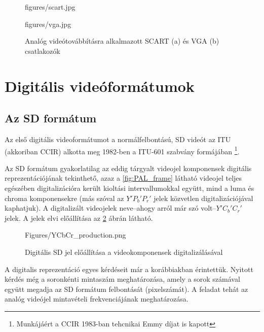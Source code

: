 \begin{figure}[]
	\centering
	\begin{minipage}[c]{0.63\textwidth}
	\begin{overpic}[width = 0.47\columnwidth ]{figures/scart.jpg}
	\end{overpic} \hfill
		\begin{overpic}[width = 0.4\columnwidth ]{figures/vga.jpg}
	\end{overpic} \end{minipage}\hfill
	\begin{minipage}[c]{0.35\textwidth}
	\caption{Analóg videótovábbításra alkalmazott SCART (a) és VGA (b) csatlakozók}
	\label{Fig:scart_vga}  \end{minipage}
\end{figure}

\section{Digitális videóformátumok}
	
\subsection{Az SD formátum}

Az első digitális videoformátumot a normálfelbontású, SD videót az ITU (akkoriban CCIR) alkotta meg 1982-ben a ITU-601 szabvány formájában \footnote{Munkájáért a CCIR 1983-ban tehcnikai Emmy díjat is kapott}.

Az SD formátum gyakorlatilag az eddig tárgyalt videojel komponensek digitális reprezentációjának tekinthető, azaz a \ref{fig:PAL_frame} látható videojel teljes egészében digitalizációra került kioltási intervallumokkal együtt, mind a luma és chroma komponensekre (más szóval az $Y'P_b'P_r'$ jelek közvetlen digitalizációjával kaphatjuk).
A digitalizált videojelek neve--ahogy arról már szó volt--$Y'C_b'C_r'$ jelek.
A jelek elvi előállítása az \ref{Fig:SD_production} ábrán látható.
\begin{figure}[]
	\centering
	\begin{overpic}[width = 0.8 \columnwidth ]{Figures/YCbCr_production.png}
	\end{overpic}
	\caption{Digitális SD jel előállítása a videokomponensek digitalizálásával}
	\label{Fig:SD_production}
\end{figure}


A digitalis reprezentáció egyes kérdéseit már a korábbiakban érintettük.
Nyitott kérdés még a soronkénti mintaszám meghatározása, amely a sorok számával együtt megadja az SD formátum felbontását (pixelszámát).
A feladat tehát az analóg videójel mintavételi frekvenciájának meghatározása.

